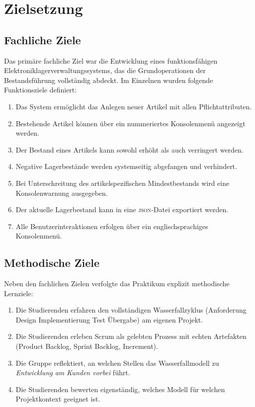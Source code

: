 \documentclass[12pt, a4paper, twoside]{report}
\newcommand{\json}{\textsc{json}}
\begin{document}
\chapter{Zielsetzung}
\label{chap:zielsetzung}

\section{Fachliche Ziele}

Das primäre fachliche Ziel war die Entwicklung eines funktionsfähigen
Elektroniklagerverwaltungssystems, das die Grundoperationen der Bestandsführung vollständig
abdeckt. Im Einzelnen wurden folgende Funktionsziele definiert:

\begin{enumerate}[leftmargin=1.5em, label=\textbf{F\arabic*.}]
  \item Das System ermöglicht das Anlegen neuer Artikel mit allen Pflichtattributen.
  \item Bestehende Artikel können über ein nummeriertes Konsolenmenü angezeigt werden.
  \item Der Bestand eines Artikels kann sowohl erhöht als auch verringert werden.
  \item Negative Lagerbestände werden systemseitig abgefangen und verhindert.
  \item Bei Unterschreitung des artikelspezifischen Mindestbestands wird eine
        Konsolenwarnung ausgegeben.
  \item Der aktuelle Lagerbestand kann in eine \json{}-Datei exportiert werden.
  \item Alle Benutzerinteraktionen erfolgen über ein englischsprachiges Konsolenmenü.
\end{enumerate}

\section{Methodische Ziele}

Neben den fachlichen Zielen verfolgte das Praktikum explizit methodische Lernziele:

\begin{enumerate}[leftmargin=1.5em, label=\textbf{M\arabic*.}]
  \item Die Studierenden erfahren den vollständigen Wasserfallzyklus (Anforderung \textrightarrow{}
        Design \textrightarrow{} Implementierung \textrightarrow{} Test \textrightarrow{} Übergabe)
        am eigenen Projekt.
  \item Die Studierenden erleben Scrum als gelebten Prozess mit echten Artefakten (Product Backlog,
        Sprint Backlog, Increment).
  \item Die Gruppe reflektiert, an welchen Stellen das Wasserfallmodell zu
        \textit{Entwicklung am Kunden vorbei} führt.
  \item Die Studierenden bewerten eigenständig, welches Modell für welchen Projektkontext geeignet
        ist.
\end{enumerate}
\end{document}
